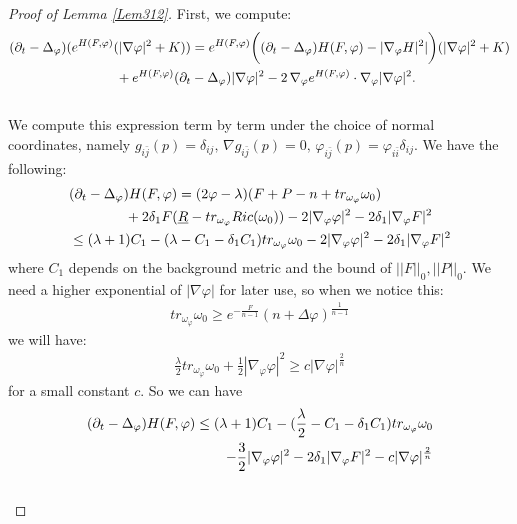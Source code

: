 \documentclass[11pt]{amsart}
\numberwithin{equation}{section}
\begin{document}
\begin{proof}[Proof of Lemma \ref{Lem312}]
First,  we compute: \\
\begin{align}
	&(\partial_t-\Delta_{\varphi})(e^{H(F,\varphi)}(|\nabla\varphi|^2+K))=e^{H(F,\varphi)}\bigg( (\partial_t-\Delta_{\varphi})H(F,\varphi)-|\nabla_{\varphi}H|^2|\bigg) (|\nabla\varphi|^2+K)\notag \\ 
	&\quad\quad\quad\quad\quad\quad\quad\quad +e^{H(F,\varphi)}(\partial_t-\Delta_{\varphi})|\nabla\varphi|^2 -2\,\nabla_{\varphi}e^{H(F,\varphi)} \cdot \nabla_{\varphi}|\nabla\varphi|^2. 
\end{align}\\
We compute this expression term by term under the choice of normal coordinates,  namely $g_{i\bar{j}}(p)=\delta_{ij},\,\nabla g_{i\bar{j}}(p)=0, \,\varphi_{i\bar{j}}(p)=\varphi_{i\bar{i}}\delta_{ij}$. We have the following: 
\begin{align}
	&(\partial_t-\Delta_{\varphi})H(F,\varphi)= (2\varphi-\lambda)(F+P-n+tr_{\omega_{\varphi}}\omega_0) \notag\\
	&\quad\quad\quad\quad +2\delta_1F(\underline R-tr_{\omega_{\varphi}} Ric(\omega_0))-2|\nabla_\varphi\varphi|^2-2\delta_1|\nabla_\varphi F|^2 \notag \\
	&\le  (\lambda+1)C_1 -(\lambda- C_1-\delta_1C_1)tr_{\omega_{\varphi}}\omega_0 -2|\nabla_\varphi\varphi|^2-2\delta_1|\nabla_\varphi F|^2
\end{align}
where $C_1$ depends on the background metric and the bound of $||F||_0,||P||_0$. We need a higher exponential of $|\nabla\varphi|$ for later use, so when we notice this: 
\begin{align}
	tr_{\omega_{\varphi}}\omega_0\ge  e^{-\frac{F}{n-1}}(n+\Delta\varphi)^{\frac{1}{n-1}}
\end{align}
we will have:
\begin{align}
	\frac{\lambda}{2}tr_{\omega_{\varphi}}\omega_0+\frac{1}{2} |\nabla_{\varphi}\varphi|^2\ge  c|\nabla\varphi|^{\frac{2}{n}}
\end{align}
for a small constant $c$. So we can have 
\begin{align}
	(\partial_t-\Delta_{\varphi})H(F,\varphi) \le  (\lambda+1)C_1 -(\frac{\lambda}{2} - C_1-\delta_1C_1)tr_{\omega_{\varphi}}\omega_0 \notag\\
	 -\frac{3}{2} |\nabla_\varphi\varphi|^2-2\delta_1|\nabla_\varphi F|^2 - c|\nabla\varphi|^{\frac{2}{n}}
\end{align}\\

\end{proof}
\end{document}
